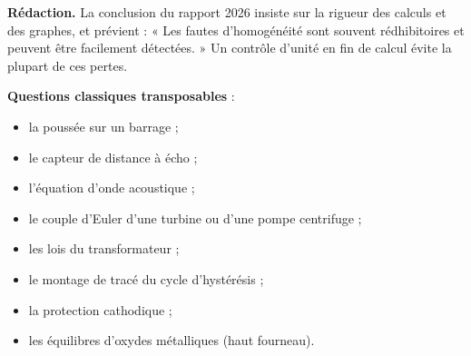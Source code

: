 \documentclass[11pt,a4paper]{article}
\providecommand{\tightlist}{\setlength{\itemsep}{0pt}\setlength{\parskip}{0pt}}
\begin{document}
\textbf{Rédaction.} La conclusion du rapport 2026 insiste sur la rigueur des calculs et des graphes, et prévient : « Les fautes d'homogénéité sont souvent rédhibitoires et peuvent être facilement détectées. » Un contrôle d'unité en fin de calcul évite la plupart de ces pertes.

\textbf{Questions classiques transposables} :

\begin{itemize}
\tightlist
\item
  la poussée sur un barrage ;
\item
  le capteur de distance à écho ;
\item
  l'équation d'onde acoustique ;
\item
  le couple d'Euler d'une turbine ou d'une pompe centrifuge ;
\item
  les lois du transformateur ;
\item
  le montage de tracé du cycle d'hystérésis ;
\item
  la protection cathodique ;
\item
  les équilibres d'oxydes métalliques (haut fourneau).
\end{itemize}
\end{document}
